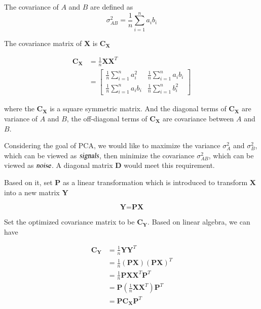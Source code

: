 \documentclass{aa}
\begin{document}
\begin{CJK*}{UTF8}{gbsn}
   
  The covariance of $A$ and $B$ are defined as
  \begin{equation}
      \sigma_{AB}^{2} = \frac{1}{n}\sum_{i=1}^{n}a_{i}b_{i}
  \end{equation}
  
  The covariance matrix of $\textbf{X}$ is $\textbf{C}_{\textbf{X}}$
  
  \begin{equation}
      \begin{aligned}
\textbf{C}_{\textbf{X}} &= \frac{1}{n}\textbf{X}\textbf{X}^{T}\\
                        &= \left[
                            \begin{matrix}
                              \frac{1}{n}\sum_{i=1}^{n}a_{i}^{2}  & \frac{1}{n}\sum_{i=1}^{n}a_{i}b_{i} \\
                              \frac{1}{n}\sum_{i=1}^{n}a_{i}b_{i} & \frac{1}{n}\sum_{i=1}^{n}b_{i}^{2}
                            \end{matrix}
   \right]
\end{aligned}
  \end{equation}
  
  
  where the $\textbf{C}_{\textbf{X}}$ is a square symmetric matrix. And the diagonal terms of $\textbf{C}_{\textbf{X}}$ are variance of $A$ and $B$, the off-diagonal terms of $\textbf{C}_{\textbf{X}}$ are covariance between $A$ and $B$. 
  
  Considering the goal of PCA, we would like to maximize the variance $\sigma_{A}^{2}$ and $\sigma_{B}^{2}$, which can be viewed as $\textsl{signals}$, then minimize the covariance $\sigma_{AB}^{2}$, which can be viewed as $\textsl{noise}$. A diagonal matrix $\textbf{D}$ would meet this requirement. 
  
  Based on it, set $\textbf{P}$ as a linear transformation which is introduced to transform $\textbf{X}$ into a new matrix $\textbf{Y}$
   
   \begin{equation}
       \textbf{Y} = \textbf{P}\textbf{X}
   \end{equation}
  
  
  Set the optimized covariance matrix to be $\textbf{C}_{\textbf{Y}}$. Based on linear algebra, we can have
  
  \begin{equation}
      \begin{split}
        \textbf{C}_{\textbf{Y}}&=\frac{1}{n}\textbf{Y}\textbf{Y}^{T}\\
          &=\frac{1}{n}\left( \textbf{P}\textbf{X} \right)\left( \textbf{P}\textbf{X} \right)^{T}\\
          &=\frac{1}{n}\textbf{P}\textbf{X}\textbf{X}^{T}\textbf{P}^{T}\\
          &= \textbf{P}\left(\frac{1}{n}\textbf{X}\textbf{X}^{T} \right)\textbf{P}^{T}\\
          &= \textbf{P}\textbf{C}_{\textbf{X}}\textbf{P}^{T}
         \end{split}
  \end{equation}
  

\end{CJK*}
\end{document}
